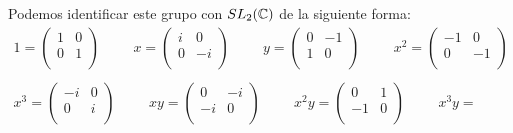 \begin{ejemplo}
\begin{enumerate}
        Podemos identificar este grupo con $SL_2(\mathbb{C})$ de la siguiente forma:
        \begin{gather*}
            1 = 
            \begin{pmatrix}
                1 & 0\\
                0 & 1\\
            \end{pmatrix}
            \hspace{1cm}
            x = 
            \begin{pmatrix}
                i & 0\\
                0 & -i\\
            \end{pmatrix}
            \hspace{1cm}
            y = 
            \begin{pmatrix}
                0 & -1\\
                1 & 0\\
            \end{pmatrix}
            \hspace{1cm}
            x^2 = 
            \begin{pmatrix}
                -1 & 0\\
                0 & -1\\
            \end{pmatrix}\\\\
            x^3 = 
            \begin{pmatrix}
                -i & 0\\
                0 & i\\
            \end{pmatrix}
            \hspace{1cm}
            xy = 
            \begin{pmatrix}
                0 & -i\\
                -i & 0\\
            \end{pmatrix}
            \hspace{1cm}
            x^2y = 
            \begin{pmatrix}
                0 & 1\\
                -1 & 0\\
            \end{pmatrix}
            \hspace{1cm}
            x^3y = 

\end{gather*}
\end{enumerate}
\end{ejemplo}
